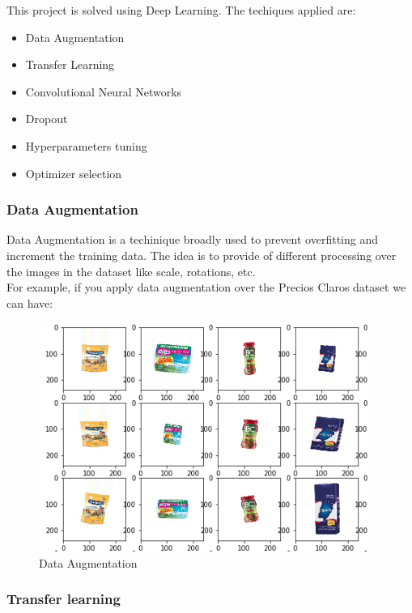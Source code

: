 \documentclass[a4paper,10pt]{article}
\begin{document}
This project is solved using Deep Learning. The techiques applied are:

\begin{itemize}
  \item Data Augmentation
  \item Transfer Learning
  \item Convolutional Neural Networks
  \item Dropout
  \item Hyperparameters tuning
  \item Optimizer selection
\end{itemize}

\subsubsection{Data Augmentation}

Data Augmentation is a techinique broadly used to prevent overfitting and increment the training data. The idea is to provide of different processing over the images in the dataset like scale, rotations, etc. \\

For example, if you apply data augmentation over the Precios Claros dataset we can have:

  
\begin{figure}[h]
  \includegraphics[width=\linewidth]{data_augmentation.png}
  \caption{Data Augmentation}
\end{figure}

\subsubsection{Transfer learning}
\end{document}
